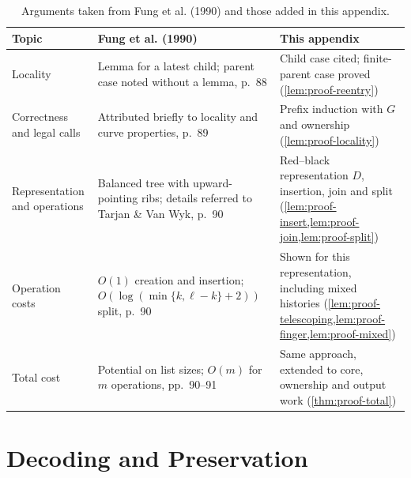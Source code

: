 \begin{table}[H]
\centering
\caption{Arguments taken from Fung et al. (1990) and those added in this appendix.}
\label{tab:proof-relation}
\small
{}
\setlength{\tabcolsep}{5pt}
\begin{tabular}{@{}>{\raggedright\arraybackslash}p{.19\linewidth}
                   >{\raggedright\arraybackslash}p{.39\linewidth}
                   >{\raggedright\arraybackslash}p{}@{}}
\toprule
\textbf{Topic} & \textbf{Fung et al. (1990)} & \textbf{This appendix} \\
\midrule
Locality & Lemma for a latest child; parent case noted without a lemma, p.~88
  & Child case cited; finite-parent case proved (\cref{lem:proof-reentry}) \\
\addlinespace
Correctness and legal calls & Attributed briefly to locality and curve properties, p.~89
  & Prefix induction with $G$ and ownership (\cref{lem:proof-locality}) \\
\addlinespace
Representation and operations & Balanced tree with upward-pointing ribs; details referred to Tarjan \& Van Wyk, p.~90
  & Red--black representation $D$, insertion, join and split (\cref{lem:proof-insert,lem:proof-join,lem:proof-split}) \\
\addlinespace
Operation costs & $O(1)$ creation and insertion; $O(\log(\min\{k,\ell-k\}+2))$ split, p.~90
  & Shown for this representation, including mixed histories (\cref{lem:proof-telescoping,lem:proof-finger,lem:proof-mixed}) \\
\addlinespace
Total cost & Potential on list sizes; $O(m)$ for $m$ operations, pp.~90--91
  & Same approach, extended to core, ownership and output work (\cref{thm:proof-total}) \\
\bottomrule
\end{tabular}
\end{table}

\section{Decoding and Preservation}
\label{sec:proof-representation}

